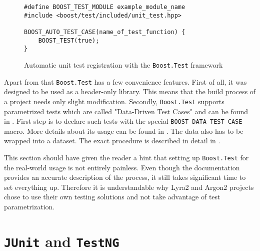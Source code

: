 \begin{figure}
\centering
\begin{verbatim}
#define BOOST_TEST_MODULE example_module_name
#include <boost/test/included/unit_test.hpp>

BOOST_AUTO_TEST_CASE(name_of_test_function) {
    BOOST_TEST(true);
}
  \end{verbatim}
  \caption{Automatic unit test registration with the \texttt{Boost.Test} framework}
  \label{figure:boost-auto-test-case}
  \end{figure}

Apart from that \texttt{Boost.Test} has a few convenience features. First of all, it was designed to be used as a header-only library. This means that the build process of a project needs only slight modification. Secondly, \texttt{Boost.Test} supports parametrized tests which are called "Data-Driven Test Cases" and can be found in \cite{boost:2017:test-data-driven}. First step is to declare such tests with the special \texttt{BOOST_DATA_TEST_CASE} macro. More details about its usage can be found in \cite{boost:2017:test-docs-data-macro}. The data also has to be wrapped into a dataset. The exact procedure is described in detail in \cite{boost:2017:test-docs-dataset}.

This section should have given the reader a hint that setting up \texttt{Boost.Test} for the real-world usage is not entirely painless. Even though the documentation provides an accurate description of the process, it still takes significant time to set everything up. Therefore it is understandable why Lyra2 and Argon2 projects chose to use their own testing solutions and not take advantage of test parametrization.

\section{\texttt{JUnit} and \texttt{TestNG}}
\label{sec:unit-junit-testng}

